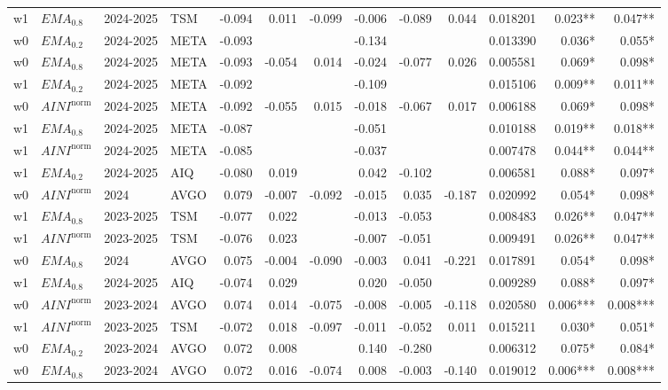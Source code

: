 \begin{tabular}{@{}llllrrrrrrrrr@{}}
w1 & $EMA_{0.8}$ & 2024-2025 & TSM & -0.094 & 0.011 & -0.099 & -0.006 & -0.089 & 0.044 & 0.018201 & 0.023** & 0.047** \\
w0 & $EMA_{0.2}$ & 2024-2025 & META & -0.093 &  &  & -0.134 &  &  & 0.013390 & 0.036* & 0.055* \\
w0 & $EMA_{0.8}$ & 2024-2025 & META & -0.093 & -0.054 & 0.014 & -0.024 & -0.077 & 0.026 & 0.005581 & 0.069* & 0.098* \\
w1 & $EMA_{0.2}$ & 2024-2025 & META & -0.092 &  &  & -0.109 &  &  & 0.015106 & 0.009** & 0.011** \\
w0 & $AINI^{\mathrm{norm}}$ & 2024-2025 & META & -0.092 & -0.055 & 0.015 & -0.018 & -0.067 & 0.017 & 0.006188 & 0.069* & 0.098* \\
w1 & $EMA_{0.8}$ & 2024-2025 & META & -0.087 &  &  & -0.051 &  &  & 0.010188 & 0.019** & 0.018** \\
w1 & $AINI^{\mathrm{norm}}$ & 2024-2025 & META & -0.085 &  &  & -0.037 &  &  & 0.007478 & 0.044** & 0.044** \\
w1 & $EMA_{0.2}$ & 2024-2025 & AIQ & -0.080 & 0.019 &  & 0.042 & -0.102 &  & 0.006581 & 0.088* & 0.097* \\
w0 & $AINI^{\mathrm{norm}}$ & 2024 & AVGO & 0.079 & -0.007 & -0.092 & -0.015 & 0.035 & -0.187 & 0.020992 & 0.054* & 0.098* \\
w1 & $EMA_{0.8}$ & 2023-2025 & TSM & -0.077 & 0.022 &  & -0.013 & -0.053 &  & 0.008483 & 0.026** & 0.047** \\
w1 & $AINI^{\mathrm{norm}}$ & 2023-2025 & TSM & -0.076 & 0.023 &  & -0.007 & -0.051 &  & 0.009491 & 0.026** & 0.047** \\
w0 & $EMA_{0.8}$ & 2024 & AVGO & 0.075 & -0.004 & -0.090 & -0.003 & 0.041 & -0.221 & 0.017891 & 0.054* & 0.098* \\
w1 & $EMA_{0.8}$ & 2024-2025 & AIQ & -0.074 & 0.029 &  & 0.020 & -0.050 &  & 0.009289 & 0.088* & 0.097* \\
w0 & $AINI^{\mathrm{norm}}$ & 2023-2024 & AVGO & 0.074 & 0.014 & -0.075 & -0.008 & -0.005 & -0.118 & 0.020580 & 0.006*** & 0.008*** \\
w1 & $AINI^{\mathrm{norm}}$ & 2023-2025 & TSM & -0.072 & 0.018 & -0.097 & -0.011 & -0.052 & 0.011 & 0.015211 & 0.030* & 0.051* \\
w0 & $EMA_{0.2}$ & 2023-2024 & AVGO & 0.072 & 0.008 &  & 0.140 & -0.280 &  & 0.006312 & 0.075* & 0.084* \\
w0 & $EMA_{0.8}$ & 2023-2024 & AVGO & 0.072 & 0.016 & -0.074 & 0.008 & -0.003 & -0.140 & 0.019012 & 0.006*** & 0.008*** \\

\end{tabular}
